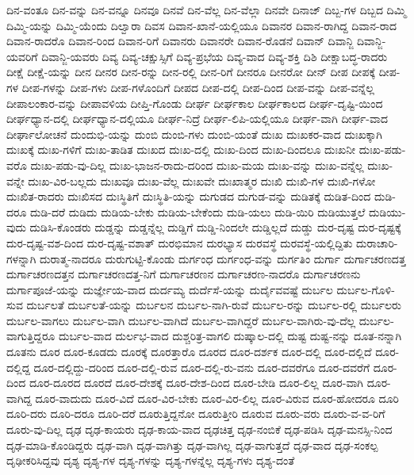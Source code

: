 {ದಿನ-ವಂತೂ
ದಿನ-ವನ್ನು
ದಿನ-ವನ್ನೂ
ದಿನವೂ
ದಿನವೆ
ದಿನ-ವೆಲ್ಲ
ದಿನ-ವೆಲ್ಲಾ
ದಿನವೇ
ದಿನಾಜ್
ದಿಬ್ಬ-ಗಳ
ದಿಬ್ಬದ
ದಿಮ್ಮಿ
ದಿಮ್ಮಿ-ಯನ್ನು
ದಿಮ್ಮಿ-ಯೆಂದು
ದಿಲ್ವಾರಾ
ದಿವಸ
ದಿವಾನ-ಖಾನೆ-ಯಲ್ಲಿಯೂ
ದಿವಾನರ
ದಿವಾನ-ರಾಗಿದ್ದ
ದಿವಾನ-ರಾದ
ದಿವಾನ-ರಾದರೊ
ದಿವಾನ-ರಿಂದ
ದಿವಾನ-ರಿಗೆ
ದಿವಾನರು
ದಿವಾನರೇ
ದಿವಾನ-ರೊಡನೆ
ದಿವಾನ್
ದಿವಾನ್ಜಿ
ದಿವಾನ್ಜಿ-ಯವರಿಗೆ
ದಿವಾನ್ಜಿ-ಯವರು
ದಿವ್ಯ
ದಿವ್ಯ-ಚಕ್ಷುಸ್ಸಿಗೆ
ದಿವ್ಯ-ಪ್ರಭೆಯ
ದಿವ್ಯ-ವಾದ
ದಿವ್ಯ-ಶಕ್ತಿ
ದಿಶಿ
ದೀಕ್ಷಾಬದ್ಧ-ರಾದರು
ದೀಕ್ಷೆ
ದೀಕ್ಷೆ-ಯನ್ನು
ದೀನ
ದೀನರ
ದೀನ-ರನ್ನು
ದೀನ-ರಲ್ಲಿ
ದೀನ-ರಿಗೆ
ದೀನರೂ
ದೀನರೋ
ದೀನ್
ದೀಪ
ದೀಪಕ್ಕೆ
ದೀಪ-ಗಳ
ದೀಪ-ಗಳನ್ನು
ದೀಪ-ಗಳು
ದೀಪ-ಗಳೊಂದಿಗೆ
ದೀಪದ
ದೀಪ-ದಲ್ಲಿ
ದೀಪ-ದಿಂದ
ದೀಪ-ವನ್ನು
ದೀಪ-ವನ್ನೆಲ್ಲ
ದೀಪಾಲಂಕಾರ-ವನ್ನು
ದೀಪಾವಳಿಯ
ದೀಪ್ತಿ-ಗೊಂಡು
ದೀರ್ಘ
ದೀರ್ಘಕಾಲ
ದೀರ್ಘಕಾಲದ
ದೀರ್ಘ-ದೃಷ್ಟಿ-ಯಿಂದ
ದೀರ್ಘಧ್ಯಾನ-ದಲ್ಲಿ
ದೀರ್ಘಧ್ಯಾನ-ದಲ್ಲಿಯೂ
ದೀರ್ಘ-ನಿದ್ರೆ
ದೀರ್ಘ-ಲಿಪಿ-ಯಲ್ಲಿಯೂ
ದೀರ್ಘ-ವಾಗಿ
ದೀರ್ಘ-ವಾದ
ದೀರ್ಘಾಲೋಚನೆ
ದುಂದುಭಿ-ಯನ್ನು
ದುಂಬಿ
ದುಂಬಿ-ಗಳು
ದುಂಬಿ-ಯಂತೆ
ದುಃಖ
ದುಃಖಕರ-ವಾದ
ದುಃಖಕ್ಕಾಗಿ
ದುಃಖಕ್ಕೆ
ದುಃಖ-ಗಳಿಗೆ
ದುಃಖ-ತಾಡಿತ
ದುಃಖದ
ದುಃಖ-ದಲ್ಲಿ
ದುಃಖ-ದಿಂದ
ದುಃಖ-ದಿಂದಲೂ
ದುಃಖನೀ
ದುಃಖ-ಪಡು-ವರೊ
ದುಃಖ-ಪಡು-ವು-ದಿಲ್ಲ
ದುಃಖ-ಭಾಜನ-ರಾದು-ದರಿಂದ
ದುಃಖ-ಮಯ
ದುಃಖ-ವನ್ನು
ದುಃಖ-ವನ್ನೆಲ್ಲ
ದುಃಖ-ವನ್ನೇ
ದುಃಖ-ವಿರ-ಬಲ್ಲದು
ದುಃಖವೂ
ದುಃಖ-ವೆಲ್ಲ
ದುಃಖವೇ
ದುಃಖಾತ್ಮರ
ದುಃಖಿ
ದುಃಖಿ-ಗಳ
ದುಃಖಿ-ಗಳೋ
ದುಃಖಿತ-ರಾದರು
ದುಃಖಿಸದ
ದುಃಸ್ಥಿತಿಗೆ
ದುಃಸ್ಥಿತಿ-ಯನ್ನು
ದುಗುಡದ
ದುಗುಡ-ವನ್ನು
ದುಡಿತಕ್ಕೆ
ದುಡಿತ-ದಿಂದ
ದುಡಿ-ದರೂ
ದುಡಿ-ದರೆ
ದುಡಿದು
ದುಡಿಯ-ಬೇಕು
ದುಡಿಯ-ಬೇಕೆಂದು
ದುಡಿ-ಯಲು
ದುಡಿ-ಯಿರಿ
ದುಡಿಯುತ್ತಲೆ
ದುಡಿಯು-ವುದು
ದುಡಿಸಿ-ಕೊಂಡರು
ದುಡ್ಡನ್ನು
ದುಡ್ಡನ್ನೆಲ್ಲ
ದುಡ್ಡಿಗೆ
ದುಡ್ಡಿ-ನಿಂದಲೇ
ದುಡ್ಡಿಲ್ಲದೆ
ದುಡ್ಡು
ದುರ-ದೃಷ್ಟ
ದುರ-ದೃಷ್ಟಕ್ಕೆ
ದುರ-ದೃಷ್ಟ-ವಶ-ದಿಂದ
ದುರ-ದೃಷ್ಟ-ವಶಾತ್
ದುರಭಿಮಾನ
ದುರಭ್ಯಾಸ
ದುರವಸ್ಥೆ
ದುರವಸ್ಥೆ-ಯಲ್ಲಿದ್ದಿತು
ದುರಾಚಾರಿ-ಗಳನ್ನಾಗಿ
ದುರಾತ್ಮ-ನಾದರೂ
ದುರುಗುಟ್ಟಿ-ಕೊಂಡು
ದುರ್ಗಂಧ
ದುರ್ಗಂಧ-ವನ್ನು
ದುರ್ಗತಿಂ
ದುರ್ಗಾ
ದುರ್ಗಾಚರಣದತ್ತ
ದುರ್ಗಾಚರಣದತ್ತನ
ದುರ್ಗಾಚರಣದತ್ತ-ನಿಗೆ
ದುರ್ಗಾಚರಣನ
ದುರ್ಗಾಚರಣ-ನಾದರೊ
ದುರ್ಗಾಚರಣನು
ದುರ್ಗಾಪೂಜೆ-ಯನ್ನು
ದುರ್ಜ್ಞೇಯ-ವಾದ
ದುರ್ದಮ್ಯ
ದುರ್ದೆಸೆ-ಯನ್ನು
ದುರ್ದೈವವಷ್ಟೆ
ದುರ್ಬಲ
ದುರ್ಬಲ-ಗೊಳಿ-ಸುವ
ದುರ್ಬಲತೆ
ದುರ್ಬಲತೆ-ಯನ್ನು
ದುರ್ಬಲನ
ದುರ್ಬಲ-ನಾಗಿ-ರುವೆ
ದುರ್ಬಲ-ರನ್ನು
ದುರ್ಬಲ-ರಲ್ಲಿ
ದುರ್ಬಲರು
ದುರ್ಬಲ-ವಾಗಲು
ದುರ್ಬಲ-ವಾಗಿ
ದುರ್ಬಲ-ವಾಗಿದೆ
ದುರ್ಬಲ-ವಾಗಿದ್ದರೆ
ದುರ್ಬಲ-ವಾಗಿರು-ವು-ದೆಲ್ಲ
ದುರ್ಬಲ-ವಾಗುತ್ತಿದ್ದರೂ
ದುರ್ಬಲ-ವಾದ
ದುರ್ಲಭ-ವಾದ
ದುಶ್ಚರಿತ್ರ-ವಾಗಲಿ
ದುಷ್ಕಾಲ-ದಲ್ಲಿ
ದುಷ್ಟ
ದುಷ್ಟ-ನನ್ನು
ದೂತ-ನನ್ನಾಗಿ
ದೂತನು
ದೂರ
ದೂರ-ಕೂಡದು
ದೂರಕ್ಕೆ
ದೂರತ್ತಾರೊ
ದೂರದ
ದೂರ-ದರ್ಶಕ
ದೂರ-ದಲ್ಲಿ
ದೂರ-ದಲ್ಲಿದೆ
ದೂರ-ದಲ್ಲಿದ್ದ
ದೂರ-ದಲ್ಲಿದ್ದು-ದರಿಂದ
ದೂರ-ದಲ್ಲಿ-ರುವ
ದೂರ-ದಲ್ಲಿ-ರು-ವನು
ದೂರ-ದವರೆಗೂ
ದೂರ-ದವರೆಗೆ
ದೂರ-ದಿಂದ
ದೂರ-ದೂರದ
ದೂರದೆ
ದೂರ-ದೇಶಕ್ಕೆ
ದೂರ-ದೇಶ-ದಿಂದ
ದೂರ-ಬೇಡಿ
ದೂರ-ಲಿಲ್ಲ
ದೂರ-ವಾಗಿ
ದೂರ-ವಾಗಿದ್ದ
ದೂರ-ವಾದುದು
ದೂರ-ವಿದೆ
ದೂರ-ವಿರ-ಬೇಕು
ದೂರ-ವಿರ-ಲಿಲ್ಲ
ದೂರ-ವಿರುವ
ದೂರ-ಹೋದರೂ
ದೂರಿ
ದೂರಿ-ದರು
ದೂರಿ-ದರೂ
ದೂರಿ-ದರೆ
ದೂರುತ್ತಿದ್ದನೋ
ದೂರುತ್ತೀರಿ
ದೂರುವ
ದೂರು-ವರು
ದೂರು-ವ-ವ-ರಿಗೆ
ದೂರು-ವು-ದಿಲ್ಲ
ದೃಢ
ದೃಢ-ಕಾಯರು
ದೃಢ-ಕಾಯ-ವಾದ
ದೃಢಚಿತ್ತ
ದೃಢ-ನಂಬಿಕೆ
ದೃಢ-ಪಡಿಸಿ
ದೃಢ-ಮನಸ್ಸಿ-ನಿಂದ
ದೃಢ-ಮಾಡಿ-ಕೊಂಡಿದ್ದರು
ದೃಢ-ವಾಗಿ
ದೃಢ-ವಾಗಿತ್ತು
ದೃಢ-ವಾಗಿಲ್ಲ
ದೃಢ-ವಾಗುತ್ತದೆ
ದೃಢ-ವಾದ
ದೃಢ-ಸಂಕಲ್ಪ
ದೃಢೀಕರಿಸಿದ್ದವು
ದೃಶ್ಯ
ದೃಶ್ಯ-ಗಳ
ದೃಶ್ಯ-ಗಳನ್ನು
ದೃಶ್ಯ-ಗಳನ್ನೆಲ್ಲ
ದೃಶ್ಯ-ಗಳು
ದೃಶ್ಯ-ದಂತೆ
}
